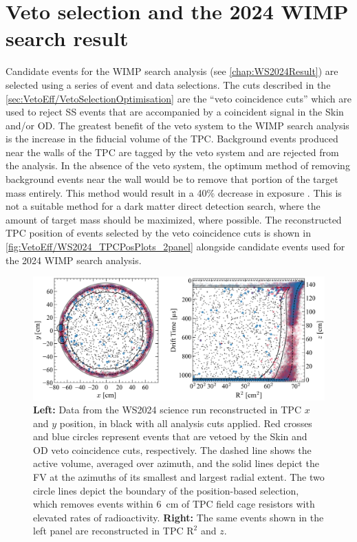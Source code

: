\section{Veto selection and the 2024 WIMP search result}\label{sec:VetoEff4WIMPSearch}
Candidate events for the WIMP search analysis (see \autoref{chap:WS2024Result}) are selected using a series of event and data selections. The cuts described in the \autoref{sec:VetoEff/VetoSelectionOptimisation} are the ``veto coincidence cuts'' which are used to reject SS events that are accompanied by a coincident signal in the Skin and/or OD. The greatest benefit of the veto system to the WIMP search analysis is the increase in the fiducial volume of the TPC. Background events produced near the walls of the TPC are tagged by the veto system and are rejected from the analysis. In the absence of the veto system, the optimum method of removing background events near the wall would be to remove that portion of the target mass entirely. This method would result in a 40\% decrease in exposure \cite{lkorley:thesis}. This is not a suitable method for a dark matter direct detection search, where the amount of target mass should be maximized, where possible. The reconstructed TPC position of events selected by the veto coincidence cuts is shown in \autoref{fig:VetoEff/WS2024_TPCPosPlots_2panel} alongside candidate events used for the 2024 WIMP search analysis.
\begin{figure}[h!]
    \centering
    \includegraphics[width=\linewidth]{figures/VetoEfficiency/WS2024_TPCPosPlots_2panel.png}
    \caption[Data from the WS2024 science run reconstructed in TPC with events that are vetoed coloured in red and blue.]{\textbf{Left:} Data from the WS2024 science run reconstructed in TPC $x$ and $y$ position, in black with all analysis cuts applied. Red crosses and blue circles represent events that are vetoed by the Skin and OD veto coincidence cuts, respectively. The dashed line shows the active volume, averaged over azimuth, and the solid lines depict the FV at the azimuths of its smallest and largest radial extent. The two circle lines depict the boundary of the position-based selection, which removes events within 6~cm of TPC field cage resistors with elevated rates of radioactivity. \textbf{Right:} The same events shown in the left panel are reconstructed in TPC $\text{R}^2$ and $z$.}
    \label{fig:VetoEff/WS2024_TPCPosPlots_2panel}
\end{figure}

